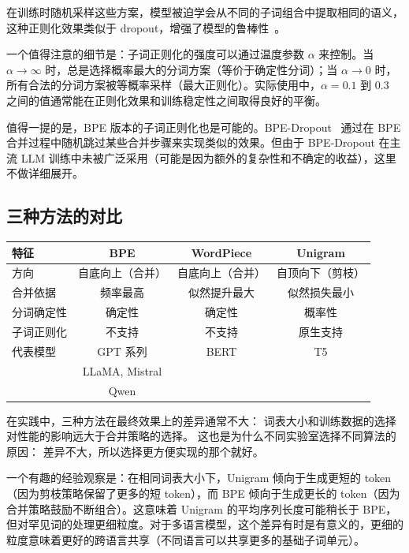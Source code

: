 在训练时随机采样这些方案，模型被迫学会从不同的子词组合中提取相同的语义，这种正则化效果类似于 dropout，增强了模型的鲁棒性~\cite{kudo2018sentencepiece}。

一个值得注意的细节是：子词正则化的强度可以通过温度参数 $\alpha$ 来控制。当 $\alpha \to \infty$ 时，总是选择概率最大的分词方案（等价于确定性分词）；当 $\alpha \to 0$ 时，所有合法的分词方案被等概率采样（最大正则化）。实际使用中，$\alpha = 0.1$ 到 $0.3$ 之间的值通常能在正则化效果和训练稳定性之间取得良好的平衡。

值得一提的是，BPE 版本的子词正则化也是可能的。BPE-Dropout~\cite{provilkov2020bpe} 通过在 BPE 合并过程中随机跳过某些合并步骤来实现类似的效果。但由于 BPE-Dropout 在主流 LLM 训练中未被广泛采用（可能是因为额外的复杂性和不确定的收益），这里不做详细展开。

\subsection{三种方法的对比}

\begin{center}\small
\renewcommand{\arraystretch}{1.3}
\begin{tabular}{lccc}
\toprule
\rowcolor{figLightGray}
\textbf{特征} & \textbf{BPE} & \textbf{WordPiece} & \textbf{Unigram} \\
\midrule
方向           & 自底向上（合并） & 自底向上（合并） & 自顶向下（剪枝） \\
合并依据       & 频率最高       & 似然提升最大     & 似然损失最小     \\
分词确定性     & 确定性         & 确定性           & 概率性           \\
子词正则化     & 不支持         & 不支持           & 原生支持         \\
代表模型       & GPT 系列       & BERT             & T5               \\
               & LLaMA, Mistral &                  &                  \\
               & Qwen           &                  &                  \\
\bottomrule
\end{tabular}
\end{center}

在实践中，三种方法在最终效果上的差异通常不大：
词表大小和训练数据的选择对性能的影响远大于合并策略的选择。
这也是为什么不同实验室选择不同算法的原因：
差异不大，所以选择更方便实现的那个就好。

一个有趣的经验观察是：在相同词表大小下，Unigram 倾向于生成更短的 token（因为剪枝策略保留了更多的短 token），而 BPE 倾向于生成更长的 token（因为合并策略鼓励不断组合）。这意味着 Unigram 的平均序列长度可能稍长于 BPE，但对罕见词的处理更细粒度。对于多语言模型，这个差异有时是有意义的，更细的粒度意味着更好的跨语言共享（不同语言可以共享更多的基础子词单元）。

